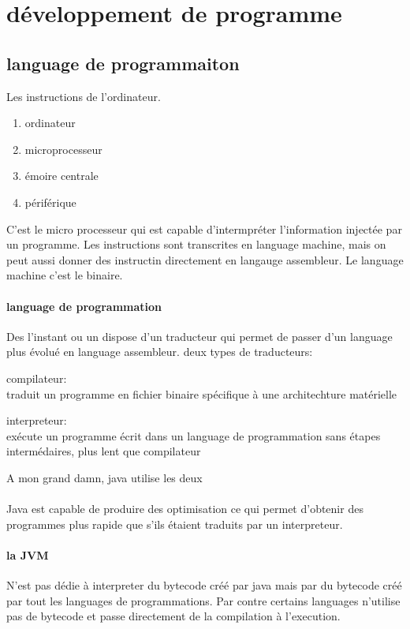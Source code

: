 \documentclass[a4paper,10pt]{article}
\begin{document}
\section{développement de programme}
\subsection{language de programmaiton}
Les instructions de l'ordinateur.
\begin{enumerate}
 \item ordinateur
 \item microprocesseur
 \item émoire centrale
 \item périférique
\end{enumerate}
C'est le micro processeur qui est capable d'intermpréter l'information injectée par un programme. Les instructions sont transcrites en language machine, mais on peut aussi donner des instructin directement en langauge assembleur.
Le language machine c'est le binaire.
\paragraph{language de programmation}
Des l'instant ou un dispose d'un traducteur qui permet de passer d'un language plus évolué en language assembleur.
\newline
deux types de traducteurs:
\begin{description}
 \item compilateur:\\{traduit un programme en fichier binaire spécifique à une architechture matérielle}
 \item interpreteur:\\{exécute un programme écrit dans un language de programmation sans étapes intermédaires, plus lent que compilateur}
\end{description}
A mon grand damn, java utilise les deux
\paragraph{}
Java est capable de produire des optimisation ce qui permet d'obtenir des programmes plus rapide que s'ils étaient traduits par un interpreteur.
\paragraph{la JVM}
N'est pas dédie à interpreter du bytecode créé par java mais par du bytecode créé par tout les languages de programmations. Par contre certains languages n'utilise pas de bytecode et passe directement de la compilation à l'execution.
\end{document}
